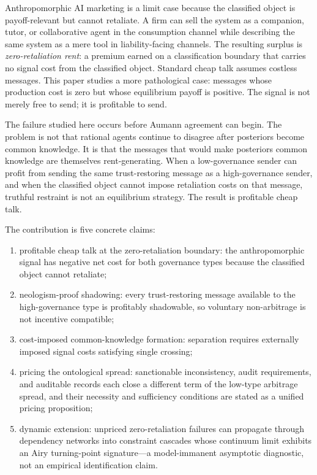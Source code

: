 \documentclass[review,authoryear]{elsarticle}
\theoremstyle{definition}
\theoremstyle{plain}
\begin{document}
Anthropomorphic AI marketing is a limit case because the classified object is payoff-relevant but cannot retaliate. A firm can sell the system as a companion, tutor, or collaborative agent in the consumption channel while describing the same system as a mere tool in liability-facing channels. The resulting surplus is \emph{zero-retaliation rent}: a premium earned on a classification boundary that carries no signal cost from the classified object. Standard cheap talk assumes costless messages. This paper studies a more pathological case: messages whose production cost is zero but whose equilibrium payoff is positive. The signal is not merely free to send; it is profitable to send.

The failure studied here occurs before Aumann agreement can begin. The problem is not that rational agents continue to disagree after posteriors become common knowledge. It is that the messages that would make posteriors common knowledge are themselves rent-generating. When a low-governance sender can profit from sending the same trust-restoring message as a high-governance sender, and when the classified object cannot impose retaliation costs on that message, truthful restraint is not an equilibrium strategy. The result is profitable cheap talk.

The contribution is five concrete claims:
\begin{enumerate}
    \item profitable cheap talk at the zero-retaliation boundary: the anthropomorphic signal has negative net cost for both governance types because the classified object cannot retaliate;
    \item neologism-proof shadowing: every trust-restoring message available to the high-governance type is profitably shadowable, so voluntary non-arbitrage is not incentive compatible;
    \item cost-imposed common-knowledge formation: separation requires externally imposed signal costs satisfying single crossing;
    \item pricing the ontological spread: sanctionable inconsistency, audit requirements, and auditable records each close a different term of the low-type arbitrage spread, and their necessity and sufficiency conditions are stated as a unified pricing proposition;
    \item dynamic extension: unpriced zero-retaliation failures can propagate through dependency networks into constraint cascades whose continuum limit exhibits an Airy turning-point signature---a model-immanent asymptotic diagnostic, not an empirical identification claim.
\end{enumerate}
\end{document}
